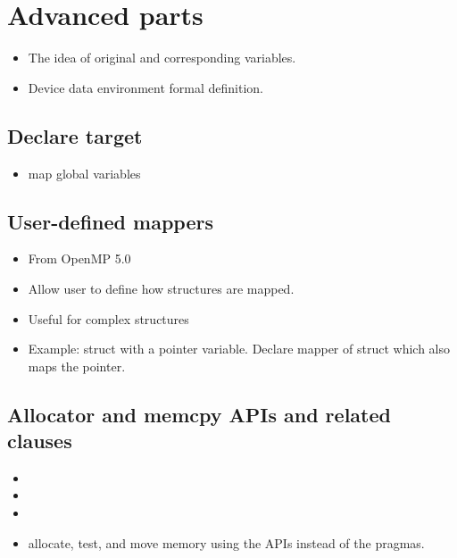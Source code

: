 \section{Advanced parts}

\begin{itemize}
  \item The idea of original and corresponding variables.
  \item Device data environment formal definition.
\end{itemize}


\subsection{Declare target}
\label{ssec:declare_target}
\begin{itemize}
  \item map global variables
\end{itemize}


\subsection{User-defined mappers}
\label{sec:mapper}
\begin{itemize}
  \item From OpenMP 5.0
  \item Allow user to define how structures are mapped.
  \item Useful for complex structures
  \item Example: struct with a pointer variable. Declare mapper of struct which also maps the pointer.
\end{itemize}

\subsection{Allocator and memcpy APIs and related clauses}
\label{sec:alloc_apis}
\begin{itemize}
  \item {}
  \item {}
  \item {}
  \item allocate, test, and move memory using the APIs instead of the pragmas.
\end{itemize}


